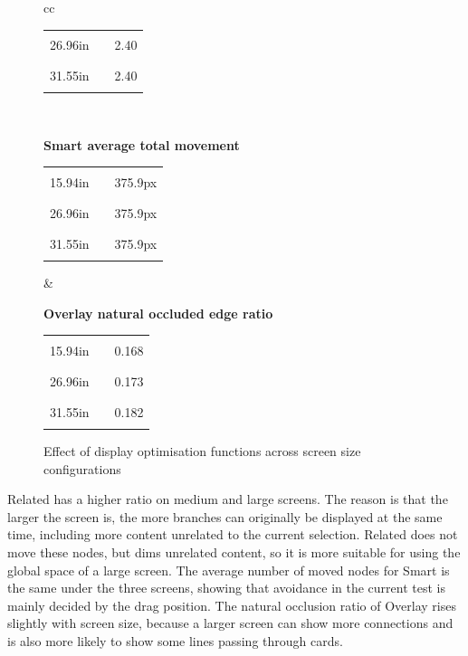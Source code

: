 \begin{center}
\begin{figure}[htbp]
\begin{tabular}{cc}
\begin{minipage}[t]{0.46\textwidth}
\begin{tabular}{@{}r l r@{}}
26.96in & \textcolor{blue!70!black}{\rule{0.2000\textwidth}{1.1ex}} & 2.40 \\
31.55in & \textcolor{blue!70!black}{\rule{0.2000\textwidth}{1.1ex}} & 2.40 \\
\end{tabular}
\end{minipage} \\[1.2em]
\begin{minipage}[t]{0.46\textwidth}
\centering
\textbf{Smart average total movement}\\[-0.2em]
\begin{tabular}{@{}r l r@{}}
15.94in & \textcolor{blue!70!black}{\rule{0.2000\textwidth}{1.1ex}} & 375.9px \\
26.96in & \textcolor{blue!70!black}{\rule{0.2000\textwidth}{1.1ex}} & 375.9px \\
31.55in & \textcolor{blue!70!black}{\rule{0.2000\textwidth}{1.1ex}} & 375.9px \\
\end{tabular}
\end{minipage}
&
\begin{minipage}[t]{0.46\textwidth}
\centering
\textbf{Overlay natural occluded edge ratio}\\[-0.2em]
\begin{tabular}{@{}r l r@{}}
15.94in & \textcolor{blue!70!black}{\rule{0.1843\textwidth}{1.1ex}} & 0.168 \\
26.96in & \textcolor{blue!70!black}{\rule{0.1901\textwidth}{1.1ex}} & 0.173 \\
31.55in & \textcolor{blue!70!black}{\rule{0.2000\textwidth}{1.1ex}} & 0.182 \\
\end{tabular}
\end{minipage}
\end{tabular}
\caption{Effect of display optimisation functions across screen size configurations}
\label{fig:display-screen-metrics}
\end{figure}

\end{center}

Related has a higher ratio on medium and large screens. The reason is that the larger the screen is, the more branches can originally be displayed at the same time, including more content unrelated to the current selection. Related does not move these nodes, but dims unrelated content, so it is more suitable for using the global space of a large screen. The average number of moved nodes for Smart is the same under the three screens, showing that avoidance in the current test is mainly decided by the drag position. The natural occlusion ratio of Overlay rises slightly with screen size, because a larger screen can show more connections and is also more likely to show some lines passing through cards.


